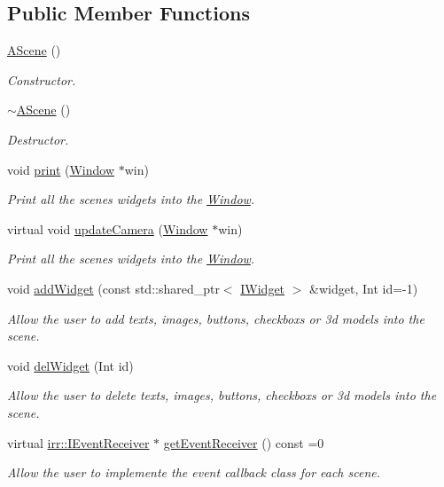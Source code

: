 \subsection*{Public Member Functions}
\begin{DoxyCompactItemize}
\item 
\hyperlink{classAScene_ad0eacf691dbc8240fdf3a42d450c1042}{A\+Scene} ()
\begin{DoxyCompactList}\small\item\em Constructor. \end{DoxyCompactList}\item 
\hyperlink{classAScene_a9faf7f1a271327227e83627432d0b210}{$\sim$\+A\+Scene} ()
\begin{DoxyCompactList}\small\item\em Destructor. \end{DoxyCompactList}\item 
void \hyperlink{classAScene_ae5d7463a823ed64f3846b5847340b68c}{print} (\hyperlink{classWindow}{Window} $\ast$win)
\begin{DoxyCompactList}\small\item\em Print all the scene\textquotesingle{}s widgets into the \hyperlink{classWindow}{Window}. \end{DoxyCompactList}\item 
virtual void \hyperlink{classAScene_a18070899d965f1811c2253ad1d939374}{update\+Camera} (\hyperlink{classWindow}{Window} $\ast$win)
\begin{DoxyCompactList}\small\item\em Print all the scene\textquotesingle{}s widgets into the \hyperlink{classWindow}{Window}. \end{DoxyCompactList}\item 
void \hyperlink{classAScene_aa711b6068dd8dee262160eedfd96ad02}{add\+Widget} (const std\+::shared\+\_\+ptr$<$ \hyperlink{classIWidget}{I\+Widget} $>$ \&widget, Int id=-\/1)
\begin{DoxyCompactList}\small\item\em Allow the user to add texts, images, buttons, checkboxs or 3d models into the scene. \end{DoxyCompactList}\item 
void \hyperlink{classAScene_ad2b0ac8cd74a8523c76b681a34b5f5b4}{del\+Widget} (Int id)
\begin{DoxyCompactList}\small\item\em Allow the user to delete texts, images, buttons, checkboxs or 3d models into the scene. \end{DoxyCompactList}\item 
virtual \hyperlink{classirr_1_1IEventReceiver}{irr\+::\+I\+Event\+Receiver} $\ast$ \hyperlink{classAScene_af521e5e6d30a5d2e5d30eb333e4d3abd}{get\+Event\+Receiver} () const =0
\begin{DoxyCompactList}\small\item\em Allow the user to implemente the event callback class for each scene. \end{DoxyCompactList}\end{DoxyCompactItemize}


